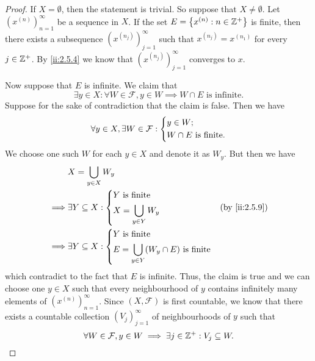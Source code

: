 \begin{proof}
  If \(X = \emptyset\), then the statement is trivial.
  So suppose that \(X \neq \emptyset\).
  Let \((x^{(n)})_{n = 1}^\infty\) be a sequence in \(X\).
  If the set \(E = \left\lbrace x^{(n)} : n \in \mathbb{Z}^+\right\rbrace\) is finite, then there exists a subsequence \((x^{(n_j)})_{j = 1}^\infty\) such that \(x^{(n_j)} = x^{(n_1)}\) for every \(j \in \mathbb{Z}^+\).
  By \cref{ii:2.5.4} we know that \((x^{(n_j)})_{j = 1}^\infty\) converges to \(x\).

  Now suppose that \(E\) is infinite.
  We claim that
  \[
    \exists y \in X : \forall W \in \mathcal{F}, y \in W \implies W \cap E \text{ is infinite}.
  \]
  Suppose for the sake of contradiction that the claim is false.
  Then we have
  \[
    \forall y \in X, \exists W \in \mathcal{F} : \begin{dcases}
      y \in W; \\
      W \cap E \text{ is finite}.
    \end{dcases}
  \]
  We choose one such \(W\) for each \(y \in X\) and denote it as \(W_y\).
  But then we have
  \begin{align*}
             & X = \bigcup_{y \in X} W_y                                                   \\
    \implies & \exists Y \subseteq X : \begin{dcases}
                                         Y \text{ is finite} \\
                                         X = \bigcup_{y \in Y} W_y
                                       \end{dcases}               &  & \by{ii:2.5.9}       \\
    \implies & \exists Y \subseteq X : \begin{dcases}
                                         Y \text{ is finite} \\
                                         E = \bigcup_{y \in Y} (W_y \cap E) \text{ is finite}
                                       \end{dcases}
  \end{align*}
  which contradict to the fact that \(E\) is infinite.
  Thus, the claim is true and we can choose one \(y \in X\) such that every neighbourhood of \(y\) contains infinitely many elements of \((x^{(n)})_{n = 1}^\infty\).
  Since \((X, \mathcal{F})\) is first countable, we know that there exists a countable collection \((V_j)_{j = 1}^\infty\) of neighbourhoods of \(y\) such that
  \[
    \forall W \in \mathcal{F}, y \in W \implies \exists j \in \mathbb{Z}^+ : V_j \subseteq W.
\]
\end{proof}
